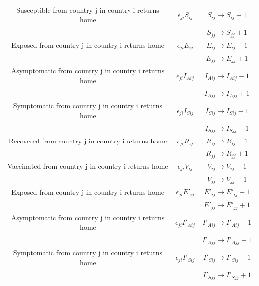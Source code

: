 \documentclass[a4paper,11pt]{article}
\theoremstyle{plain}
\theoremstyle{definition}
\begin{document}
\begin{table}[hbtp]
\begin{center}
\begin{tabular}{ c|c|c }
                \hline
		        Susceptible from country j in country i returns home & $\epsilon_{ji} S_{ij}$ & $S_{ij} \mapsto S_{ij} - 1$ \\
		        &  &  $S_{jj} \mapsto S_{jj} + 1$\\
		        \hline
		        Exposed from country j in country i returns home & $\epsilon_{ji} E_{ij}$ & $E_{ij} \mapsto E_{ij} - 1$ \\
		        &  &  $E_{jj} \mapsto E_{jj} + 1$\\
		        \hline
		        Asymptomatic from country j in country i returns home & $\epsilon_{ji} I_{Aij}$ & $I_{Aij} \mapsto I_{Aij} - 1$ \\
		        &  &  $I_{Ajj} \mapsto I_{Ajj} + 1$\\
		        \hline
		        Symptomatic from country j in country i returns home & $\epsilon_{ji} I_{Sij}$ & $I_{Sij} \mapsto I_{Sij} - 1$ \\
		        &  &  $I_{Sjj} \mapsto I_{Sjj} + 1$\\
		        \hline
		        Recovered from country j in country i returns home & $\epsilon_{ji} R_{ij}$ & $R_{ij} \mapsto R_{ij} - 1$ \\
		        &  &  $R_{jj} \mapsto R_{jj} + 1$\\
		        \hline
		        Vaccinated from country j in country i returns home & $\epsilon_{ji} V_{ij}$ & $V_{ij} \mapsto V_{ij} - 1$ \\
		        &  &  $V_{jj} \mapsto V_{jj} + 1$\\
		        \hline
		        Exposed from country j in country i returns home & $\epsilon_{ji} E'_{ij}$ & $E'_{ij} \mapsto E'_{ij} - 1$ \\
		        &  &  $E'_{jj} \mapsto E'_{jj} + 1$\\
		        \hline
		        Asymptomatic from country j in country i returns home & $\epsilon_{ji} I'_{Aij}$ & $I'_{Aij} \mapsto I'_{Aij} - 1$ \\
		        &  &  $I'_{Ajj} \mapsto I'_{Ajj} + 1$\\
		        \hline
		        Symptomatic from country j in country i returns home & $\epsilon_{ji} I'_{Sij}$ & $I'_{Sij} \mapsto I'_{Sij} - 1$ \\
		        &  &  $I'_{Sjj} \mapsto I'_{Sjj} + 1$\\
			\end{tabular}
			\label{tab:C}
		\end{center}
\end{table}
\end{document}
